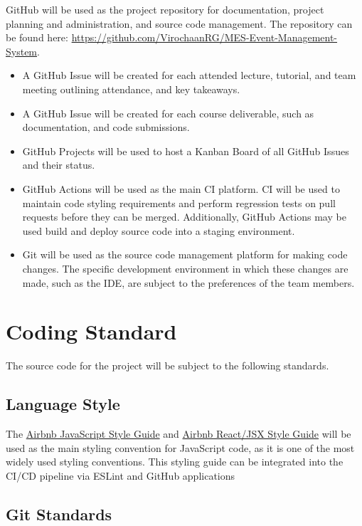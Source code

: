 \documentclass{article}
\begin{document}
\begin{flushleft}
GitHub will be used as the project repository for documentation, project planning and administration, and source code management. The repository can be found here: \url{https://github.com/VirochaanRG/MES-Event-Management-System}.
\begin{itemize}
    \item A GitHub Issue will be created for each attended lecture, tutorial, and team meeting outlining attendance, and key takeaways.
    \item A GitHub Issue will be created for each course deliverable, such as documentation, and code submissions.
    \item GitHub Projects will be used to host a Kanban Board of all GitHub Issues and their status.
    \item GitHub Actions will be used as the main CI platform. CI will be used to maintain code styling requirements and perform regression tests on pull requests before they can be merged.
    Additionally, GitHub Actions may be used build and deploy source code into a staging environment.
    \item Git will be used as the source code management platform for making code changes. The specific development environment in which these changes are made, such as the IDE, are subject to the preferences of the team members.
\end{itemize}
\end{flushleft}

\section{Coding Standard}

The source code for the project will be subject to the following standards.

\subsection{Language Style}

The \href{https://github.com/airbnb/javascript}{Airbnb JavaScript Style Guide} and \href{https://github.com/airbnb/javascript/tree/master/react}{Airbnb React/JSX Style Guide} will be used as the main styling convention for JavaScript code, as it is one of the most widely used styling conventions. This styling guide can be integrated into the CI/CD pipeline via ESLint and GitHub applications

\subsection{Git Standards}
\end{document}
